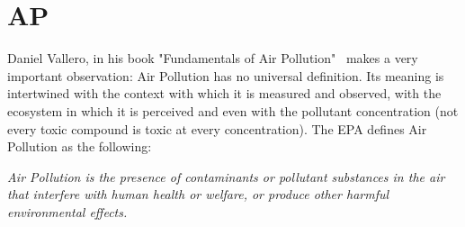 

\section{\acrlong{AP}}%
\label{sec:ap}

Daniel Vallero, in his book "Fundamentals of Air
Pollution"~\cite{Vallero2014} makes a very important observation: Air
Pollution has no universal definition. Its meaning is intertwined with
the context with which it is measured and observed, with the ecosystem
in which it is perceived and even with the pollutant concentration (not
every toxic compound is toxic at every concentration). The \gls{EPA}
defines Air Pollution as the following:

\begin{center}
    \begin{minipage}{0.8\textwidth}

        \noindent \textit{Air Pollution is the presence of contaminants
        or pollutant substances in the air that interfere with human
        health or welfare, or produce other harmful environmental effects.}

    \end{minipage}
\end{center}

